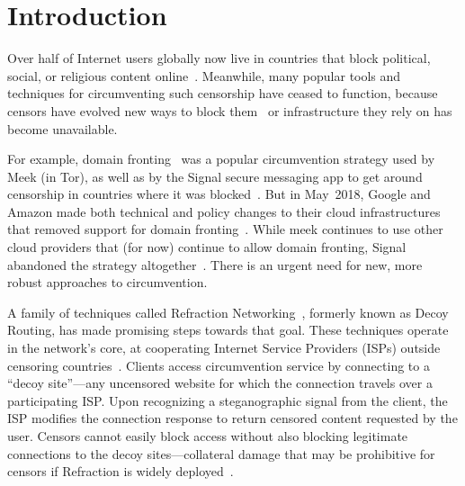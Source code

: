 \documentclass[letterpaper,twocolumn,10pt]{article}
\begin{document}
\FigHighLevel

\section{Introduction}




Over half of Internet users globally
now live in countries that block political, social, or religious content
online~\cite{fotn2018}.
Meanwhile, many popular tools and techniques for circumventing such censorship
have ceased to function, because censors have evolved new ways to block them~\cite{ensafi-tor,great-cannon}
or infrastructure they rely on has become unavailable.

For example, domain fronting~\cite{meek} was a popular circumvention
strategy used by Meek (in Tor), as well as by the Signal secure messaging app to
get around censorship in countries where it was
blocked~\cite{signal,signal-domain-fronting}.
But in May~2018, Google and Amazon made both technical and policy changes to
their cloud infrastructures that removed support for domain
fronting~\cite{aws-front}. While meek
continues to use other cloud providers that (for now) continue to allow domain
fronting, Signal abandoned the strategy altogether~\cite{signal-back-on-front}.
There is an urgent need for new, more robust approaches to circumvention.


A family of techniques called Refraction Networking~\cite{telex11,cirripede11,curveball11,tapdance14,rebound15,slitheen16,waterfall17}, formerly known
as Decoy Routing, has made promising steps towards that goal.
These techniques operate in the network's core, at cooperating Internet Service Providers
(ISPs) outside censoring countries~\cite{refraction-site}.  Clients access circumvention service by connecting to a ``decoy site''---any uncensored website for which the connection travels over a participating ISP\@.  Upon recognizing a steganographic signal from the client, the ISP modifies the connection response to return censored content requested by the user.
Censors cannot easily block access without also blocking legitimate connections to the decoy sites---collateral damage that may be prohibitive for censors if Refraction is widely deployed~\cite{robinson2013collateral}.
\end{document}

